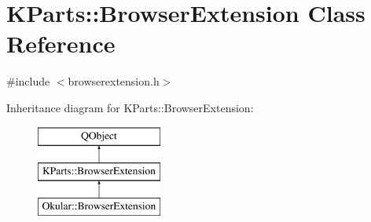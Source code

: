 \hypertarget{classKParts_1_1BrowserExtension}{\section{K\+Parts\+:\+:Browser\+Extension Class Reference}
\label{classKParts_1_1BrowserExtension}
}


{\ttfamily \#include $<$browserextension.\+h$>$}

Inheritance diagram for K\+Parts\+:\+:Browser\+Extension\+:\begin{figure}[H]
\begin{center}
\leavevmode
\includegraphics[height=3.000000cm]{classKParts_1_1BrowserExtension}
\end{center}
\end{figure}
